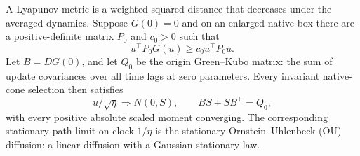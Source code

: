 \begin{lemma}
\label{lem:regular-transfer}
A Lyapunov metric is a weighted squared distance that decreases under
the averaged dynamics. Suppose $G(0)=0$ and on an enlarged native box there
are a positive-definite
matrix $P_0$ and $c_0>0$ such that
\[
 u^\top P_0G(u)\geq c_0u^\top P_0u.
\]
Let $B=DG(0)$, and let $Q_0$ be the origin Green--Kubo matrix: the sum
of update covariances over all time lags at zero parameters. Every
invariant native-cone selection then satisfies
\[
 u/\sqrt\eta\Rightarrow N(0,S),\qquad BS+SB^\top=Q_0,
\]
with every positive absolute scaled moment converging. The corresponding
stationary path limit on clock $1/\eta$ is the stationary Ornstein--Uhlenbeck
(OU) diffusion: a linear diffusion with a Gaussian stationary law.
\end{lemma}
